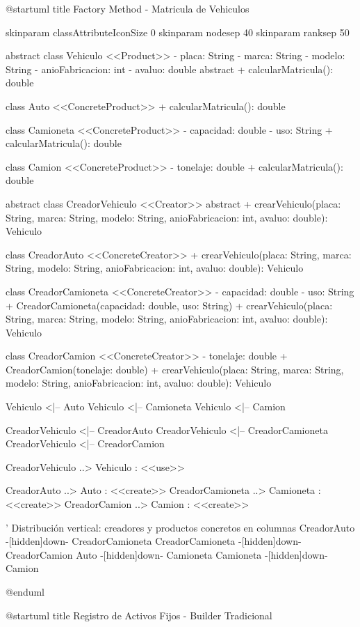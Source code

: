 @startuml
title Factory Method - Matricula de Vehiculos

skinparam classAttributeIconSize 0
skinparam nodesep 40
skinparam ranksep 50

abstract class Vehiculo <<Product>> {
  - placa: String
  - marca: String
  - modelo: String
  - anioFabricacion: int
  - avaluo: double
  {abstract} + calcularMatricula(): double
}

class Auto <<ConcreteProduct>> {
  + calcularMatricula(): double
}

class Camioneta <<ConcreteProduct>> {
  - capacidad: double
  - uso: String
  + calcularMatricula(): double
}

class Camion <<ConcreteProduct>> {
  - tonelaje: double
  + calcularMatricula(): double
}

abstract class CreadorVehiculo <<Creator>> {
  {abstract} + crearVehiculo(placa: String, marca: String, modelo: String, anioFabricacion: int, avaluo: double): Vehiculo
}

class CreadorAuto <<ConcreteCreator>> {
  + crearVehiculo(placa: String, marca: String, modelo: String, anioFabricacion: int, avaluo: double): Vehiculo
}

class CreadorCamioneta <<ConcreteCreator>> {
  - capacidad: double
  - uso: String
  + CreadorCamioneta(capacidad: double, uso: String)
  + crearVehiculo(placa: String, marca: String, modelo: String, anioFabricacion: int, avaluo: double): Vehiculo
}

class CreadorCamion <<ConcreteCreator>> {
  - tonelaje: double
  + CreadorCamion(tonelaje: double)
  + crearVehiculo(placa: String, marca: String, modelo: String, anioFabricacion: int, avaluo: double): Vehiculo
}

Vehiculo <|-- Auto
Vehiculo <|-- Camioneta
Vehiculo <|-- Camion

CreadorVehiculo <|-- CreadorAuto
CreadorVehiculo <|-- CreadorCamioneta
CreadorVehiculo <|-- CreadorCamion

CreadorVehiculo ..> Vehiculo : <<use>>

CreadorAuto ..> Auto : <<create>>
CreadorCamioneta ..> Camioneta : <<create>>
CreadorCamion ..> Camion : <<create>>

' Distribución vertical: creadores y productos concretos en columnas
CreadorAuto -[hidden]down- CreadorCamioneta
CreadorCamioneta -[hidden]down- CreadorCamion
Auto -[hidden]down- Camioneta
Camioneta -[hidden]down- Camion

@enduml


@startuml
title Registro de Activos Fijos - Builder Tradicional

